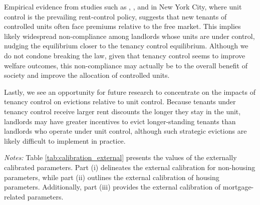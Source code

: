 \documentclass[parskip=full]{article}
\newenvironment{fignote2}[1]
{
\par
\medskip
\begin{minipage}{#1}
\footnotesize
}
{
\end{minipage}
}
\begin{document}
Empirical evidence from studies such as \citet{nagy-1997}, \citet{early-2000}, and \citet{cjq-2023} in New York City, where unit control is the prevailing rent-control policy, suggests that new tenants of controlled units often face premiums relative to the free market. This implies likely widespread non-compliance among landlords whose units are under control, nudging the equilibrium closer to the tenancy control equilibrium. Although we do not condone breaking the law, given that tenancy control seems to improve welfare outcomes, this non-compliance may actually be to the overall benefit of society and improve the allocation of controlled units.

Lastly, we see an opportunity for future research to concentrate on the impacts of tenancy control on evictions relative to unit control. Because tenants under tenancy control receive larger rent discounts the longer they stay in the unit, landlords may have greater incentives to evict longer-standing tenants than landlords who operate under unit control, although such strategic evictions are likely difficult to implement in practice.




\vspace{1cm}

\begin{table}[H]
    \centering
    \caption{Externally assigned parameter values}
    \vspace{-1.25cm}
    \label{tab:calibration_external}
    
    \vspace{-0.5cm}
    \begin{fignote2}{1.11\textwidth}
    \textit{Notes:} Table \ref{tab:calibration_external} presents the values of the externally calibrated parameters. Part (i) delineates the external calibration for non-housing parameters, while part (ii) outlines the external calibration of housing parameters. Additionally, part (iii) provides the external calibration of mortgage-related parameters.
    \end{fignote2}
\end{table}
\end{document}
